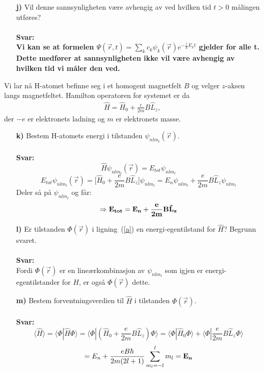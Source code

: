 \documentclass[11pt,a4paper]{report}
\newcounter{excount}[chapter]
\newenvironment{exercise}[1][]{\addtocounter{excount}{1} \noindent {\bf Oppgave
    \arabic{excount} \ \ #1}\hspace{2mm}}{\vspace{4mm}}
\begin{document}
\begin{exercise}[\\]
\begin{itemize}
\item[\bf j)] Vil denne sannsynligheten v{\ae}re avhengig av ved hvilken tid $t > 0$
m\aa lingen utf\o res?\\
\\
\textbf{Svar:\\
Vi kan se at formelen $\Psi(\vec{r},t) = \sum_{k}c_{k}\psi_{k}(\vec{r})e^{-\frac{i}{\hbar}E_{k}t}$ gjelder for alle t. Dette medfører at sannsynligheten ikke vil være avhengig av hvilken tid vi måler den ved.}


%
\end{itemize}
%

\noindent
Vi lar n{\aa} H-atomet befinne seg i et homogent magnetfelt $B$ og velger $z$-aksen langs magnetfeltet. Hamilton operatoren for systemet er da
\begin{eqnarray}
\hat{H} = \hat{H}_{0} + \frac{e}{2m} B \hat{L}_{z},
\end{eqnarray}
der $-e$ er elektronets ladning og $m$ er elektronets masse.
\begin{itemize}
\item[\bf k)] Bestem H-atomets energi i tilstanden $\psi_{n l m_{l}}(\vec{r})$.\\
\\
\textbf{Svar:}\\
\begin{equation}
\hat{H}\psi_{nlm_{l}}(\vec{r})=E_{tot}\psi_{nlm_{l}}
\end{equation}
\begin{equation}
E_{tot}\psi_{nlm_{l}}(\vec{r})=\bigg[\hat{H}_{0}+\frac{e}{2m}B\hat{L}_{z}\bigg]\psi_{nlm_{l}} = E_{n}\psi_{nlm_{l}}+\frac{e}{2m}B\hat{L}_{z}\psi_{nlm_{l}}
\end{equation}
Deler så på $\psi_{nlm_{l}}$ og får:
\begin{equation}
\Rightarrow \bf E_{tot} = E_{n} + \frac{e}{2m}B\hat{L}_{z}
\end{equation}

\item[\bf l)] Er tilstanden $\Phi (\vec{r})$ i ligning~(\ref{a}) en energi-egentilstand for $\hat{H}$? Begrunn svaret.\\
\\
\textbf{Svar:}\\
Fordi $\Phi(\vec{r})$ er en lineærkombinasjon av $\psi_{nlm_{l}}$ som igjen er energi-egentilstander for $\hat{H}$, er også $\Phi(\vec{r})$ dette. 

\item[\bf m)] Bestem forventningsverdien til $\hat{H}$ i tilstanden $\Phi (\vec{r})$.\\
\\
\textbf{Svar:}\\
\begin{equation}
\langle\hat{H}\rangle=\langle\Phi|\hat{H}\Phi\rangle = \langle\Phi|(\hat{H}_{0}+\frac{e}{2m}B\hat{L}_{z})\Phi\rangle = \langle\Phi|\hat{H}_{0}\Phi\rangle+\langle\Phi|\frac{e}{2m}B\hat{L}_{z}\Phi\rangle
\end{equation}
\begin{equation}
= E_{n} + \frac{eB\hbar}{2m(2l+1)}\sum_{m_{l}=-l}^{l}m_{l} = \bf E_{n}
\end{equation}


\end{itemize}
\end{exercise}
\end{document}
